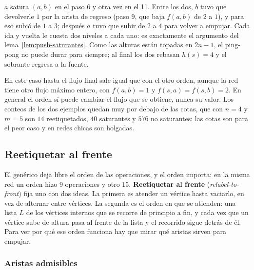 \documentclass[11pt,letterpaper]{article}
\begin{document}
\begin{ejemplo}
\begin{center}
  \end{center}
  $a$ satura $(a, b)$ en el paso 6 y otra vez en el 11. Entre los dos,
  $b$ tuvo que devolverle $1$ por la arista de regreso (paso 9, que
  baja $f(a, b)$ de $2$ a $1$), y para eso subió de $1$ a $3$; después
  $a$ tuvo que subir de $2$ a $4$ para volver a empujar. Cada ida y
  vuelta le cuesta dos niveles a cada uno: es exactamente el argumento
  del lema~\ref{lem:push-saturantes}. Como las alturas están topadas
  en $2n - 1$, el ping-pong no puede durar para siempre; al final los
  dos rebasan $h(s) = 4$ y el sobrante regresa a la fuente.
\end{ejemplo}

En este caso hasta el flujo final sale igual que con el otro orden,
aunque la red tiene otro flujo máximo entero, con $f(a, b) = 1$ y
$f(s, a) = f(s, b) = 2$. En general el orden sí puede cambiar el flujo
que se obtiene, nunca su valor. Los conteos de los dos ejemplos quedan
muy por debajo de las cotas, que con $n = 4$ y $m = 5$ son $14$
reetiquetados, $40$ saturantes y $576$ no saturantes: las cotas son
para el peor caso y en redes chicas son holgadas.


\subsection*{Reetiquetar al frente}

El genérico deja libre el orden de las operaciones, y el orden importa:
en la misma red un orden hizo $9$ operaciones y otro $15$.
\textbf{Reetiquetar al frente} (\textit{relabel-to-front}) fija uno
con dos ideas. La primera es atender un vértice hasta vaciarlo, en vez
de alternar entre vértices. La segunda es el orden en que se atienden:
una lista $L$ de los vértices internos que se recorre de principio a
fin, y cada vez que un vértice sube de altura pasa al frente de la
lista y el recorrido sigue detrás de él. Para ver por qué ese orden
funciona hay que mirar qué aristas sirven para empujar.

\subsubsection*{Aristas admisibles}
\end{document}
